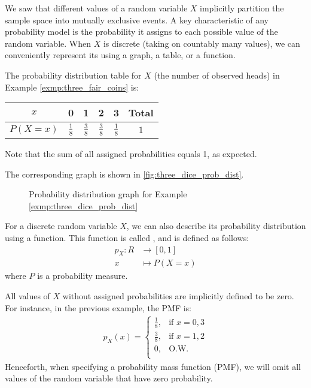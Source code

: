 We saw that different values of a random variable \( X \) implicitly partition the sample space into mutually exclusive events.
A key characteristic of any probability model is the probability it assigns to each possible value of the random variable.
When \( X \) is discrete (taking on countably many values), we can conveniently represent its  using a graph, a table, or a function.
\begin{exmp}\label{exmp:three_dice_prob_dist}
    The probability distribution table for \( X \) (the number of observed heads) in Example \autoref{exmp:three_fair_coins} is:
	\begin{center}
	\begin{tabular}{|c|c|c|c|c|c|}
	\hline
	\( x \) & 0 & 1 & 2 & 3 & Total \\
	\hline
	\( P(X = x) \) & \( \frac{1}{8} \) & \( \frac{3}{8} \) & \( \frac{3}{8} \) & \( \frac{1}{8} \) & \( 1 \) \\
	\hline
	\end{tabular}
	\end{center}
    Note that the sum of all assigned probabilities equals 1, as expected.

    The corresponding graph is shown in \autoref{fig:three_dice_prob_dist}.
    \begin{figure}[t]
    \begin{center}
    \end{center}
    \caption{Probability distribution graph for Example \autoref{exmp:three_dice_prob_dist}}
    \label{fig:three_dice_prob_dist}
    \end{figure}
\end{exmp}
For a discrete random variable \( X \), we can also describe its probability distribution using a function.
This function is called , and is defined as follows:
\begin{align*}
    p_{X} \colon R &\to [0, 1] \\
    x &\mapsto P(X = x)
\end{align*}
where \( P \) is a probability measure.

All values of \( X \) without assigned probabilities are implicitly defined to be zero.
For instance, in the previous example, the PMF is:
\begin{gather*}
    p_{X}(x) = \begin{cases}
        \frac{1}{8}, & \text{if } x = 0, 3\\
        \frac{3}{8}, & \text{if } x = 1, 2\\
        0, & \text{O.W.}\\
    \end{cases}
\end{gather*}
Henceforth, when specifying a probability mass function (PMF), we will omit all values of the random variable that have zero probability.

